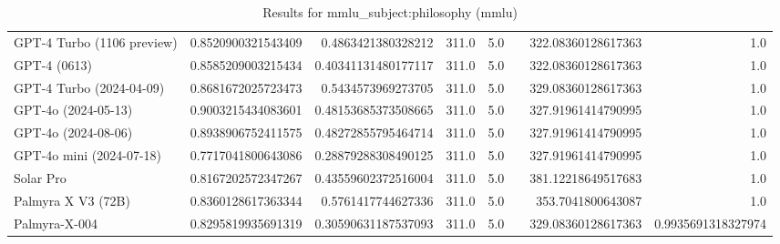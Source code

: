\begin{table}[htp]
{\begin{tabular}{lrrrrrrr}
GPT-4 Turbo (1106 preview) & 0.8520900321543409 & 0.4863421380328212 & 311.0 & 5.0 &  & 322.08360128617363 & 1.0 \\
GPT-4 (0613) & 0.8585209003215434 & 0.40341131480177117 & 311.0 & 5.0 &  & 322.08360128617363 & 1.0 \\
GPT-4 Turbo (2024-04-09) & 0.8681672025723473 & 0.5434573969273705 & 311.0 & 5.0 &  & 329.08360128617363 & 1.0 \\
GPT-4o (2024-05-13) & 0.9003215434083601 & 0.48153685373508665 & 311.0 & 5.0 &  & 327.91961414790995 & 1.0 \\
GPT-4o (2024-08-06) & 0.8938906752411575 & 0.48272855795464714 & 311.0 & 5.0 &  & 327.91961414790995 & 1.0 \\
GPT-4o mini (2024-07-18) & 0.7717041800643086 & 0.28879288308490125 & 311.0 & 5.0 &  & 327.91961414790995 & 1.0 \\
Solar Pro & 0.8167202572347267 & 0.43559602372516004 & 311.0 & 5.0 &  & 381.12218649517683 & 1.0 \\
Palmyra X V3 (72B) & 0.8360128617363344 & 0.5761417744627336 & 311.0 & 5.0 &  & 353.7041800643087 & 1.0 \\
Palmyra-X-004 & 0.8295819935691319 & 0.30590631187537093 & 311.0 & 5.0 &  & 329.08360128617363 & 0.9935691318327974 \\
\bottomrule
\end{tabular}}
\caption{Results for mmlu_subject:philosophy (mmlu)}
\label{fig:mmlu_subject:philosophy (mmlu)}
\end{table}